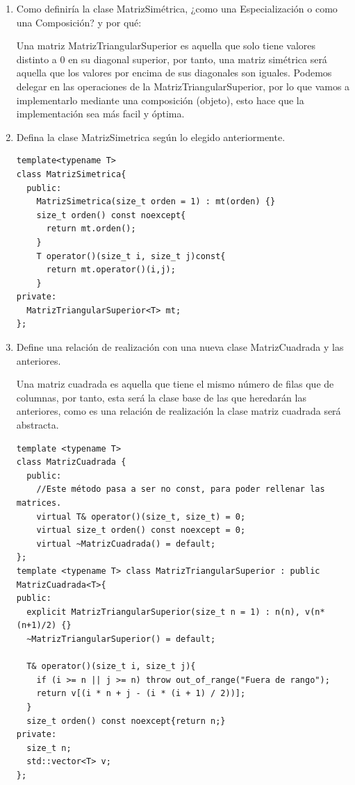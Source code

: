 \begin{enumerate}[label=\alph*)]
  \item Como definiría la clase MatrizSimétrica, ¿como una Especialización o como una Composición? y por qué:

  Una matriz MatrizTriangularSuperior es aquella que solo tiene valores distinto a 0 en su diagonal superior, por tanto, una matriz simétrica será aquella que los valores por encima de sus diagonales son iguales. Podemos delegar en las operaciones de la MatrizTriangularSuperior, por lo que vamos a implementarlo mediante una composición (objeto), esto hace que la implementación sea más facil y óptima.
  \newpage
  \item Defina la clase MatrizSimetrica según lo elegido anteriormente.

\begin{verbatim}
template<typename T>
class MatrizSimetrica{
  public:
    MatrizSimetrica(size_t orden = 1) : mt(orden) {}
    size_t orden() const noexcept{
      return mt.orden();
    }
    T operator()(size_t i, size_t j)const{
      return mt.operator()(i,j);
    }
private:
  MatrizTriangularSuperior<T> mt;
};

\end{verbatim}
  \item Define una relación de realización con una nueva clase MatrizCuadrada y las anteriores.
  
  Una matriz cuadrada es aquella que tiene el mismo número de filas que de columnas, por tanto, esta será la clase base de las que heredarán las anteriores, como es una relación de realización la clase matriz cuadrada será abstracta.
  
\begin{verbatim}
template <typename T>
class MatrizCuadrada {
  public:
    //Este método pasa a ser no const, para poder rellenar las matrices.
    virtual T& operator()(size_t, size_t) = 0;
    virtual size_t orden() const noexcept = 0;
    virtual ~MatrizCuadrada() = default;
};
template <typename T> class MatrizTriangularSuperior : public MatrizCuadrada<T>{
public:
  explicit MatrizTriangularSuperior(size_t n = 1) : n(n), v(n*(n+1)/2) {}
  ~MatrizTriangularSuperior() = default;

  T& operator()(size_t i, size_t j){
    if (i >= n || j >= n) throw out_of_range("Fuera de rango");
    return v[(i * n + j - (i * (i + 1) / 2))];
  }
  size_t orden() const noexcept{return n;}
private:
  size_t n;
  std::vector<T> v;
};







\end{verbatim}
\end{enumerate}
